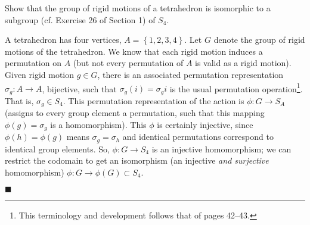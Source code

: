 \documentclass[12pt]{article}
\renewcommand{\qed}{\hfill$\blacksquare$}
\renewenvironment{proof}{\begin{addmargin}[1em]{0em}\begin{newproof}}{\end{newproof}\end{addmargin}\qed}
\newenvironment{problem}[2][Exercise]{\begin{trivlist}
\item[\hskip \labelsep {\bfseries #1}\hskip \labelsep {\bfseries #2.}]}{\end{trivlist}}
\begin{document}
\begin{problem}{1.7.20}
Show that the group of rigid motions of a tetrahedron is isomorphic to a subgroup (cf. Exercise 26 of Section 1) of $S_4$.
\end{problem}
\begin{proof}
A tetrahedron has four vertices, $A=\left\{1,2,3,4\right\}$. Let $G$ denote the group of rigid motions of the tetrahedron. We know that each rigid motion induces a permutation on $A$ (but not every permutation of $A$ is valid as a rigid motion). Given rigid motion $g\in G$, there is an associated permutation representation $\sigma_g : A \rightarrow A$, bijective, such that $\sigma_g \left( i \right)= \sigma_g i $ is the usual permutation operation\footnote{This terminology and development follows that of pages 42--43.}. That is, $\sigma_g\in S_4$. This permutation representation of the action is $\phi:G\rightarrow S_A$ (assigns to every group element a permutation, such that this mapping $\phi\left(g\right)=\sigma_g$ is a homomorphism). This $\phi$ is certainly injective, since $\phi\left(h\right)=\phi\left(g\right)$ means $\sigma_g = \sigma_h$ and identical permutations correspond to identical group elements. So, $\phi:G\rightarrow S_4$ is an injective homomorphism; we can restrict the codomain to get an isomorphism (an injective \textit{and surjective} homomorphism) $\phi:G\rightarrow \phi\left(G\right)\subset S_4$.
\end{proof}
\end{document}
